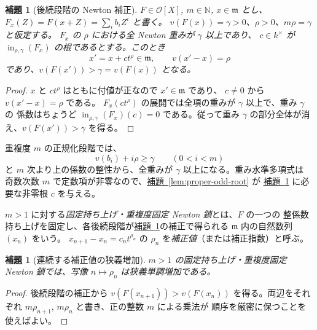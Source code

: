 \documentclass[11pt,uplatex,dvipdfmx]{jsarticle}
\newcommand{\Val}{v}
\newcommand{\Init}{\operatorname{in}}
\newcommand{\Ocal}{\mathcal O}
\newcommand{\namedref}[2]{\hyperref[#2]{#1~\ref*{#2}}}
\theoremstyle{proofnote}
\newtheorem{lemma}[theorem]{補題}
\begin{document}
\begin{lemma}[後続段階の Newton 補正]
\label{lem:successor-correction}
  \(F\in\Ocal[X]\), \(m\in\mathbb N\), \(x\in\mathfrak m\) とし、
  \(F_x(Z)=F(x+Z)=\sum_i b_iZ^i\) と書く。
  \(\Val(F(x))=\gamma>0\)、\(\rho>0\)、\(m\rho=\gamma\) と仮定する。
  \(F_x\) の \(\rho\) における全 Newton 重みが \(\gamma\) 以上であり、
  \(c\in k^\times\) が \(\Init_{\rho,\gamma}(F_x)\) の根であるとする。このとき
  \[
    x'=x+ct^\rho\in\mathfrak m,
    \qquad \Val(x'-x)=\rho
  \]
  であり、\(\Val(F(x'))>\gamma=\Val(F(x))\) となる。
\end{lemma}
\begin{proof}
  \(x\) と \(ct^\rho\) はともに付値が正なので \(x'\in\mathfrak m\) であり、
  \(c\ne0\) から \(\Val(x'-x)=\rho\) である。
  \(F_x(ct^\rho)\) の展開では全項の重みが \(\gamma\) 以上で、重み \(\gamma\) の
  係数はちょうど \(\Init_{\rho,\gamma}(F_x)(c)=0\) である。従って重み
  \(\gamma\) の部分全体が消え、\(\Val(F(x'))>\gamma\) を得る。
\end{proof}

重複度 \(m\) の正規化段階では、
\[
  \Val(b_i)+i\rho\ge\gamma\qquad(0<i<m)
  \tag{NB}\label{eq:successor-nonbelow}
\]
と \(m\) 次より上の係数の整性から、全重みが \(\gamma\) 以上になる。重み水準多項式は
奇数次数 \(m\) で定数項が非零なので、\namedref{補題}{lem:proper-odd-root} が
\namedref{補題}{lem:successor-correction} に必要な非零根 \(c\) を与える。

\(m>1\) に対する\emph{固定持ち上げ・重複度固定 Newton 鎖}とは、\(F\) の一つの
整係数持ち上げを固定し、各後続段階が\namedref{補題}{lem:successor-correction}の補正で得られる
\(\mathfrak m\) 内の自然数列 \((x_n)\) をいう。
\(x_{n+1}-x_n=c_nt^{\rho_n}\) の \(\rho_n\) を\emph{補正値}（または補正指数）と呼ぶ。

\begin{lemma}[連続する補正値の狭義増加]
\label{lem:successor-values-strict}
  \(m>1\) の固定持ち上げ・重複度固定 Newton 鎖では、写像
  \(n\mapsto\rho_n\) は狭義単調増加である。
\end{lemma}
\begin{proof}
  後続段階の補正から
  \(\Val(F(x_{n+1}))>\Val(F(x_n))\) を得る。両辺をそれぞれ
  \(m\rho_{n+1}\), \(m\rho_n\) と書き、正の整数 \(m\) による乗法が
  順序を厳密に保つことを使えばよい。
\end{proof}
\end{document}
